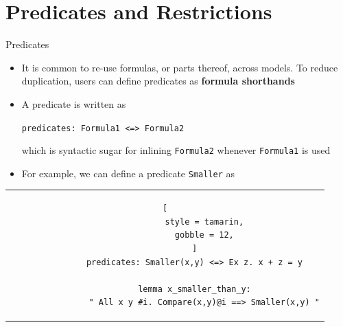 \documentclass[11pt,aspectratio=169]{beamer}
\begin{document}

\section{Predicates and Restrictions}


\begin{frame}[fragile,t]{Predicates}
    \begin{itemize}
        \item It is common to re-use formulas, or parts thereof, across models. 
              To reduce duplication, users can define predicates as
              \textbf{formula shorthands}
        \item A predicate is written as
        \begin{center}
            \verb|predicates: Formula1 <=> Formula2|
        \end{center}    
        which is syntactic sugar for inlining \verb|Formula2| whenever
        \verb|Formula1| is used
        \item For example, we can define a predicate \texttt{Smaller} as
    \end{itemize}
    \begin{center}
        \begin{tabular}{c}
            \begin{lstlisting}[
                style = tamarin,
                gobble = 12,
            ]
            predicates: Smaller(x,y) <=> Ex z. x + z = y
            
            lemma x_smaller_than_y:
                " All x y #i. Compare(x,y)@i ==> Smaller(x,y) "
            \end{lstlisting}
        \end{tabular}
    \end{center}
\end{frame}
\end{document}
